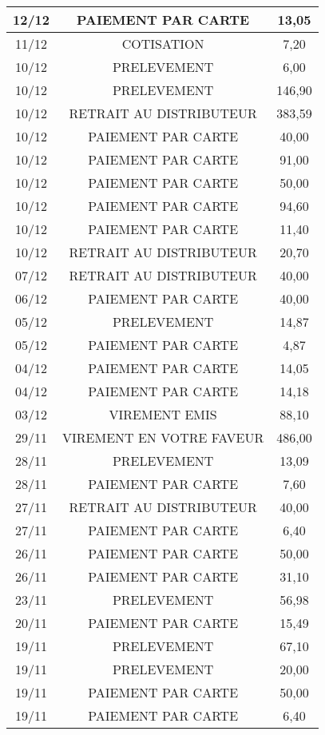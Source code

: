 \begin{longtable}{|c|c|c|}
\hline
12/12 & PAIEMENT PAR CARTE & 13,05 \\
\hline
11/12 & COTISATION & 7,20 \\
\hline
10/12 & PRELEVEMENT & 6,00 \\
\hline
10/12 & PRELEVEMENT & 146,90 \\
\hline
10/12 & RETRAIT AU DISTRIBUTEUR & 383,59 \\
\hline
10/12 & PAIEMENT PAR CARTE & 40,00 \\
\hline
10/12 & PAIEMENT PAR CARTE & 91,00 \\
\hline
10/12 & PAIEMENT PAR CARTE & 50,00 \\
\hline
10/12 & PAIEMENT PAR CARTE & 94,60 \\
\hline
10/12 & PAIEMENT PAR CARTE & 11,40 \\
\hline
10/12 & RETRAIT AU DISTRIBUTEUR & 20,70 \\
\hline
07/12 & RETRAIT AU DISTRIBUTEUR & 40,00 \\
\hline
06/12 & PAIEMENT PAR CARTE & 40,00 \\
\hline
05/12 & PRELEVEMENT & 14,87 \\
\hline
05/12 & PAIEMENT PAR CARTE & 4,87 \\
\hline
04/12 & PAIEMENT PAR CARTE & 14,05 \\
\hline
04/12 & PAIEMENT PAR CARTE & 14,18 \\
\hline
03/12 & VIREMENT EMIS & 88,10 \\
\hline
29/11 & VIREMENT EN VOTRE FAVEUR & 486,00 \\
\hline
28/11 & PRELEVEMENT & 13,09 \\
\hline
28/11 & PAIEMENT PAR CARTE & 7,60 \\
\hline
27/11 & RETRAIT AU DISTRIBUTEUR & 40,00 \\
\hline
27/11 & PAIEMENT PAR CARTE & 6,40 \\
\hline
26/11 & PAIEMENT PAR CARTE & 50,00 \\
\hline
26/11 & PAIEMENT PAR CARTE & 31,10 \\
\hline
23/11 & PRELEVEMENT & 56,98 \\
\hline
20/11 & PAIEMENT PAR CARTE & 15,49 \\
\hline
19/11 & PRELEVEMENT & 67,10 \\
\hline
19/11 & PRELEVEMENT & 20,00 \\
\hline
19/11 & PAIEMENT PAR CARTE & 50,00 \\
\hline
19/11 & PAIEMENT PAR CARTE & 6,40 \\
\hline

\end{longtable}
